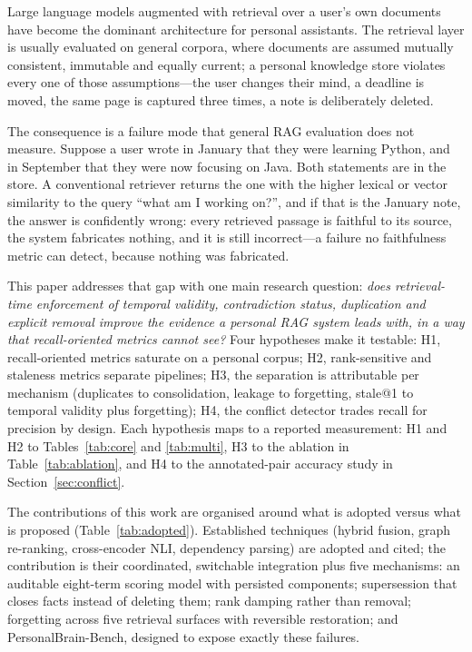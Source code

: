 \documentclass[conference]{IEEEtran}
\begin{document}
Large language models augmented with retrieval over a user's own documents have become the dominant architecture for personal assistants. The retrieval layer is usually evaluated on general corpora, where documents are assumed mutually consistent, immutable and equally current; a personal knowledge store violates every one of those assumptions---the user changes their mind, a deadline is moved, the same page is captured three times, a note is deliberately deleted.

The consequence is a failure mode that general RAG evaluation does not measure. Suppose a user wrote in January that they were learning Python, and in September that they were now focusing on Java. Both statements are in the store. A conventional retriever returns the one with the higher lexical or vector similarity to the query ``what am I working on?'', and if that is the January note, the answer is confidently wrong: every retrieved passage is faithful to its source, the system fabricates nothing, and it is still incorrect---a failure no faithfulness metric can detect, because nothing was fabricated.

This paper addresses that gap with one main research question: \emph{does retrieval-time enforcement of temporal validity, contradiction status, duplication and explicit removal improve the evidence a personal RAG system leads with, in a way that recall-oriented metrics cannot see?} Four hypotheses make it testable: H1, recall-oriented metrics saturate on a personal corpus; H2, rank-sensitive and staleness metrics separate pipelines; H3, the separation is attributable per mechanism (duplicates to consolidation, leakage to forgetting, stale@1 to temporal validity plus forgetting); H4, the conflict detector trades recall for precision by design. Each hypothesis maps to a reported measurement: H1 and H2 to Tables~\ref{tab:core} and \ref{tab:multi}, H3 to the ablation in Table~\ref{tab:ablation}, and H4 to the annotated-pair accuracy study in Section~\ref{sec:conflict}.

The contributions of this work are organised around what is adopted versus what is proposed (Table~\ref{tab:adopted}). Established techniques (hybrid fusion, graph re-ranking, cross-encoder NLI, dependency parsing) are adopted and cited; the contribution is their coordinated, switchable integration plus five mechanisms: an auditable eight-term scoring model with persisted components; supersession that closes facts instead of deleting them; rank damping rather than removal; forgetting across five retrieval surfaces with reversible restoration; and PersonalBrain-Bench, designed to expose exactly these failures.
\end{document}
